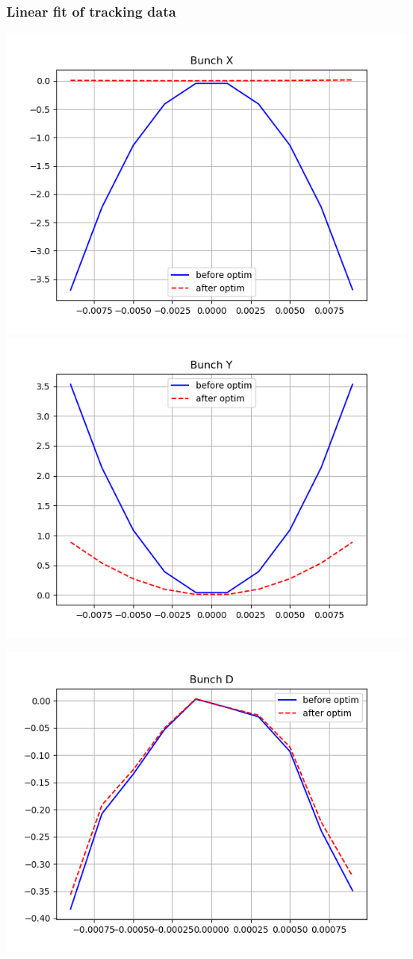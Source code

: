 \documentclass[pdf]{beamer}
\begin{document}
\begin{frame}\frametitle{Linear fit of tracking data}
\centering
\includegraphics[scale=.33]{decoh/Xbunch/Wy_vs_X_decoh}%
\includegraphics[scale=.33]{decoh/Ybunch/Wy_vs_Y_decoh}

\includegraphics[scale=.33]{decoh/Dbunch/Wy_vs_D_decoh}
\end{frame}
\end{document}
